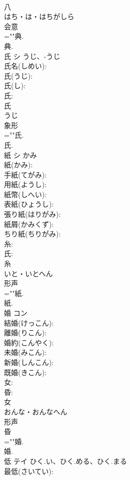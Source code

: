 \documentclass[8pt]{extreport}
\begin{document}
\begin{CJK}{UTF8}{min}
\\	八	
\\	はち・は・はちがしら	
\\	会意 
\\	=""典.
\\	典.
\\	氏	シ	うじ、-うじ		
\\	氏名(しめい): 
\\	氏(うじ): 
\\	氏(し): 
\\	氏: 
\\	氏	
\\	うじ	
\\	象形 
\\	=""氏.
\\	氏.
\\	紙	シ	かみ		
\\	紙(かみ): 
\\	手紙(てがみ): 
\\	用紙(ようし): 
\\	紙幣(しへい): 
\\	表紙(ひょうし): 
\\	張り紙(はりがみ): 
\\	紙屑(かみくず): 
\\	ちり紙(ちりがみ): 
\\	糸: 
\\	氏: 
\\	糸	
\\	いと・いとへん	
\\	形声 
\\	=""紙.
\\	紙.
\\	婚	コン			
\\	結婚(けっこん): 
\\	離婚(りこん): 
\\	婚約(こんやく): 
\\	未婚(みこん): 
\\	新婚(しんこん): 
\\	既婚(きこん): 
\\	女: 
\\	昏: 
\\	女	
\\	おんな・おんなへん	
\\	形声 
\\	昏 
\\	=""婚.
\\	婚.
\\	低	テイ	ひく.い、ひく.める、ひく.まる		
\\	最低(さいてい): 

\end{CJK}
\end{document}
